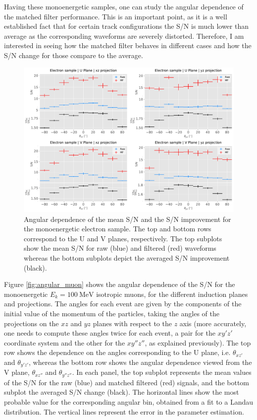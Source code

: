 Having these monoenergetic samples, one can study the angular dependence of the matched filter performance. This is an important point, as it is a well established fact that for certain track configurations the S/N is much lower than average as the corresponding waveforms are severely distorted. Therefore, I am interested in seeing how the matched filter behaves in different cases and how the S/N change for those compare to the average.

\begin{figure}[t]
	\centering
	\includegraphics[width=0.9\linewidth]{Images/Matched_Filter/larsoft_electron_angular_alt.pdf}
	\caption[Angular dependence of the mean S/N and the S/N improvement for the monoenergetic electron sample.]{Angular dependence of the mean S/N and the S/N improvement for the monoenergetic electron sample. The top and bottom rows correspond to the U and V planes, respectively. The top subplots show the mean S/N for raw (blue) and filtered (red) waveforms whereas the bottom subplots depict the averaged S/N improvement (black).}
	\label{fig:angular_electron}
\end{figure}

Figure \ref{fig:angular_muon} shows the angular dependence of the S/N for the monoenergetic $E_{k}=100 \ \mathrm{MeV}$ isotropic muons, for the different induction planes and projections. The angles for each event are given by the components of the initial value of the momentum of the particles, taking the angles of the projections on the $xz$ and $yz$ planes with respect to the $z$ axis (more accurately, one needs to compute these angles twice for each event, a pair for the $xy'z'$ coordinate system and the other for the $xy''z''$, as explained previously). The top row shows the dependence on the angles corresponding to the U plane, i.e. $\theta_{xz'}$ and $\theta_{y'z'}$, whereas the bottom row shows the angular dependence viewed from the V plane, $\theta_{xz''}$ and $\theta_{y''z''}$. In each panel, the top subplot represents the mean values of the S/N for the raw (blue) and matched filtered (red) signals, and the bottom subplot the averaged S/N change (black). The horizontal lines show the most probable value for the corresponding angular bin, obtained from a fit to a Landau distribution. The vertical lines represent the error in the parameter estimation.

